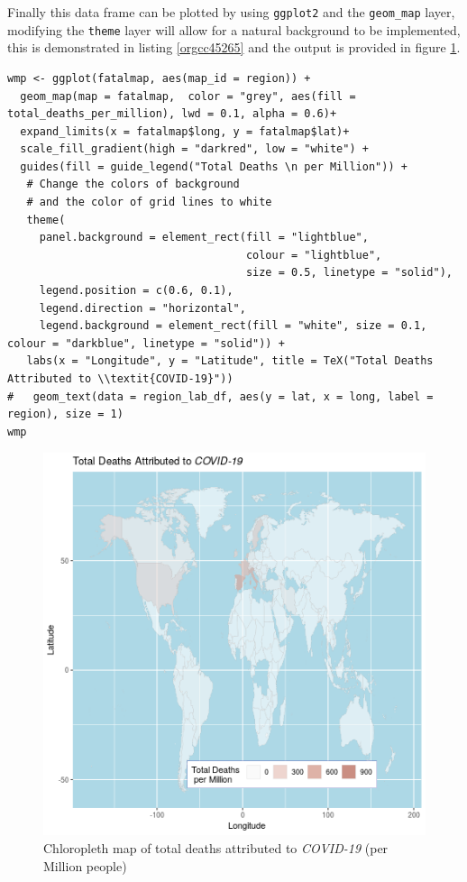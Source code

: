 \documentclass[11pt]{article}
\begin{document}
Finally this data frame can be plotted by using \texttt{ggplot2} and the \texttt{geom\_map}
layer, modifying the \texttt{theme} layer will allow for a natural background to be implemented,
this is demonstrated in listing \ref{orgcc45265} and the output is provided in figure \ref{fig:orgced88bc}.

\begin{listing}[htbp]
\begin{verbatim}
wmp <- ggplot(fatalmap, aes(map_id = region)) +
  geom_map(map = fatalmap,  color = "grey", aes(fill = total_deaths_per_million), lwd = 0.1, alpha = 0.6)+
  expand_limits(x = fatalmap$long, y = fatalmap$lat)+
  scale_fill_gradient(high = "darkred", low = "white") +
  guides(fill = guide_legend("Total Deaths \n per Million")) +
   # Change the colors of background
   # and the color of grid lines to white
   theme(
     panel.background = element_rect(fill = "lightblue",
                                     colour = "lightblue",
                                     size = 0.5, linetype = "solid"),
     legend.position = c(0.6, 0.1),
     legend.direction = "horizontal",
     legend.background = element_rect(fill = "white", size = 0.1, colour = "darkblue", linetype = "solid")) +
   labs(x = "Longitude", y = "Latitude", title = TeX("Total Deaths Attributed to \\textit{COVID-19}"))
#   geom_text(data = region_lab_df, aes(y = lat, x = long, label = region), size = 1)
wmp

\end{verbatim}
\caption{\label{orgcc45265}use \texttt{ggplot2} to create a chloropleth map from data, output in figure \ref{fig:orgced88bc}}
\end{listing}


\begin{figure}[htbp]
\centering
\includegraphics[width=16cm]{FirstChALL.png}
\caption{\label{fig:orgced88bc}Chloropleth map of total deaths attributed to \emph{COVID-19} (per Million people)}
\end{figure}
\end{document}
